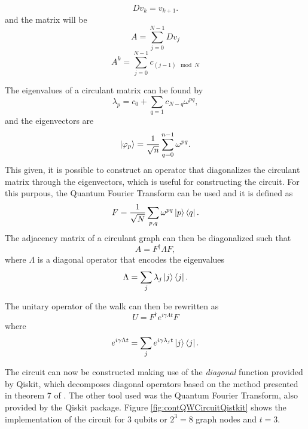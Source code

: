 \documentclass[../../dissertation.tex]{subfiles}
\begin{document}
\begin{equation}
    Dv_k = v_{k+1}.
\end{equation}
and the matrix will be
\begin{equation}
	A = \sum_{j=0}^{N-1} D v_j 
\end{equation}
\begin{equation}
	A^k = \sum_{j=0}^{N-1} c_{(j-1)\mod{N}}
\end{equation}\par
The eigenvalues of a circulant matrix can be found by
\begin{equation}
\lambda_p = c_0 + \sum_{q=1} c_{N-q} \omega^{pq},
\end{equation}
and the eigenvectors are 
\begin{equation}
\ket{\varphi_p} = \frac{1}{\sqrt{n}} \sum_{q=0}^{n-1} \omega^{pq}.
\end{equation}
This given, it is possible to construct an operator that diagonalizes the circulant matrix through the eigenvectors, which is useful for constructing the circuit. For this purpous, the Quantum Fourier Transform can be used and it is defined as 
\begin{equation}
F = \frac{1}{\sqrt{N}} \sum_{p,q} \omega^{pq} \ket{p}\bra{q}.
\end{equation}
The adjacency matrix of a circulant graph can then be diagonalized such that
\begin{equation}\label{eq:diag_adj}
    A = F^{\dagger} \Lambda F,
\end{equation}
where $\Lambda$ is a diagonal operator that encodes the eigenvalues
\begin{equation}
\Lambda = \sum_{j} \lambda_j \ket{j}\bra{j}.
\end{equation}\par
The unitary operator of the walk can then be rewritten as
\begin{equation}\label{eq:diagUniOpCont}
    U = F^{\dagger}e^{i\gamma \Lambda t} F
\end{equation}
where
\begin{equation}
    e^{i\gamma \Lambda t} = \sum_{j} e^{i\gamma \lambda_j t} \ket{j}\bra{j}.
\end{equation}\par
The circuit can now be constructed making use of the \textit{diagonal} function provided by Qiskit, which decomposes diagonal operators based on the method presented in theorem 7 of \cite{Shende06}. The other tool used was the Quantum Fourier Transform, also provided by the Qiskit package. Figure \ref{fig:contQWCircuitQistkit} shows the implementation of the circuit for 3 qubits or $2^3=8$ graph nodes and $t=3$.
\end{document}
